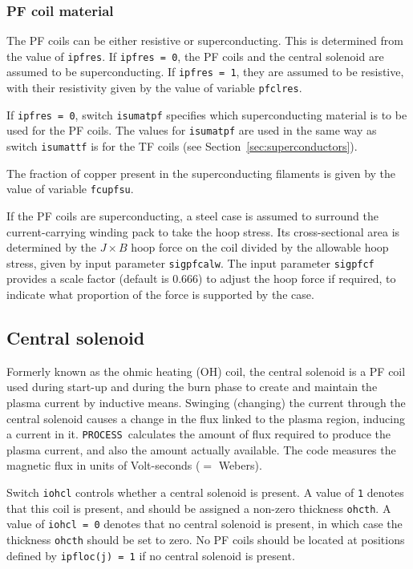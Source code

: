 \documentclass[11pt,a4paper]{report}
\newcommand{\process}{\mbox{\texttt{PROCESS}}}
\begin{document}
\subsubsection{PF coil material}

The PF coils can be either resistive or superconducting. This is determined
from the value of \texttt{ipfres}. If \texttt{ipfres = 0}, the PF coils and
the central solenoid are assumed to be superconducting. If \texttt{ipfres = 1},
they are assumed to be resistive, with their resistivity given by the value of
variable \texttt{pfclres}.

If \texttt{ipfres = 0}, switch \texttt{isumatpf} specifies which
superconducting material is to be used for the PF coils. The values for
\texttt{isumatpf} are used in the same way as switch \texttt{isumattf} is for
the TF coils (see Section~\ref{sec:superconductors}).

The fraction of copper present in the superconducting filaments is given by
the value of variable \texttt{fcupfsu}.

If the PF coils are superconducting, a steel case is assumed to surround the
current-carrying winding pack to take the hoop stress. Its cross-sectional
area is determined by the $J \times B$ hoop force on the coil divided by the
allowable hoop stress, given by input parameter \texttt{sigpfcalw}. The input
parameter \texttt{sigpfcf} provides a scale factor (default is 0.666) to
adjust the hoop force if required, to indicate what proportion of the force is
supported by the case.

\subsection{Central solenoid}
\label{sec:ohcoil}

Formerly known as the ohmic heating (OH) coil, the central solenoid is a PF
coil used during start-up and during the burn phase to create
and maintain the plasma current by inductive means. Swinging (changing) the
current through the central solenoid causes a change in the flux linked to the
plasma region, inducing a current in it. \process\ calculates the amount of
flux required to produce the plasma current, and also the amount actually
available. The code measures the magnetic flux in units of Volt-seconds ($=$
Webers).

Switch \texttt{iohcl} controls whether a central solenoid is present. A value
of \texttt{1} denotes that this coil is present, and should be assigned a
non-zero thickness \texttt{ohcth}. A value of \texttt{iohcl = 0} denotes that
no central solenoid is present, in which case the thickness \texttt{ohcth}
should be set to zero. No PF coils should be located at positions defined by
\texttt{ipfloc(j) = 1} if no central solenoid is present.
\end{document}
